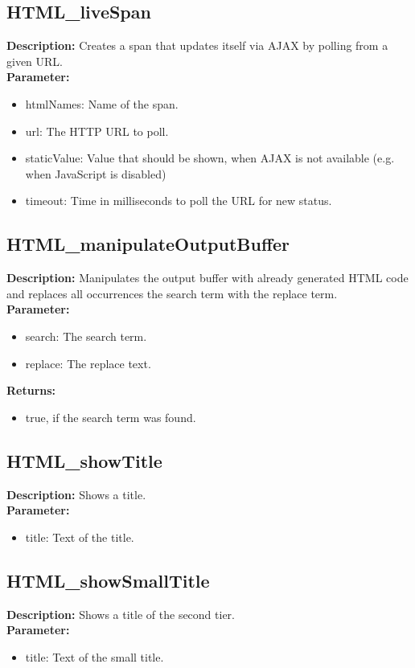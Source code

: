\subsection{HTML\_liveSpan}
\textbf{Description:} Creates a span that updates itself via AJAX by polling from a given URL.\\
\textbf{Parameter:}
\begin{itemize}
\item htmlNames: Name of the span.
\item url: The HTTP URL to poll.
\item staticValue: Value that should be shown, when AJAX is not available (e.g. when JavaScript is disabled)
\item timeout: Time in milliseconds to poll the URL for new status.
\end{itemize}

\subsection{HTML\_manipulateOutputBuffer}
\textbf{Description:} Manipulates the output buffer with already generated HTML code and replaces all occurrences the search term with the replace term.\\
\textbf{Parameter:}
\begin{itemize}
\item search: The search term.
\item replace: The replace text.
\end{itemize}
\textbf{Returns:}
\begin{itemize}
\item true, if the search term was found.
\end{itemize}

\subsection{HTML\_showTitle}
\textbf{Description:} Shows a title.\\
\textbf{Parameter:}
\begin{itemize}
\item title: Text of the title.
\end{itemize}

\subsection{HTML\_showSmallTitle}
\textbf{Description:} Shows a title of the second tier.\\
\textbf{Parameter:}
\begin{itemize}
\item title: Text of the small title.
\end{itemize}

